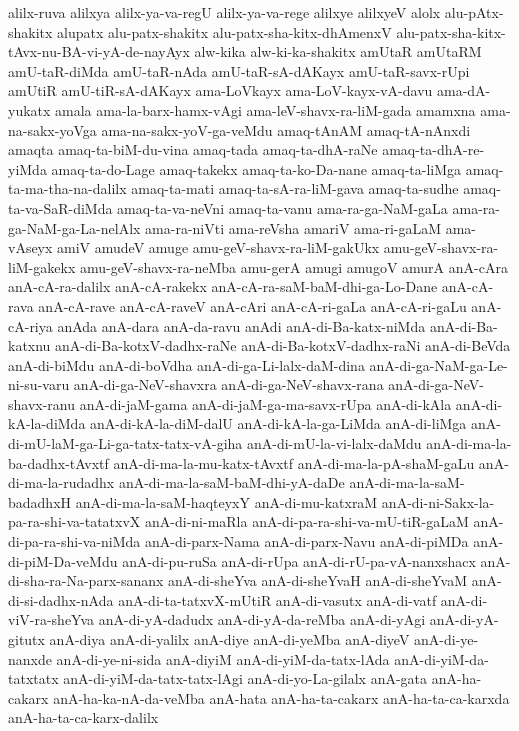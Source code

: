 {alilx-ruva
alilxya
alilx-ya-va-regU
alilx-ya-va-rege
alilxye
alilxyeV
alolx
alu-pAtx-shakitx
alupatx
alu-patx-shakitx
alu-patx-sha-kitx-dhAmenxV
alu-patx-sha-kitx-tAvx-nu-BA-vi-yA-de-nayAyx
alw-kika
alw-ki-ka-shakitx
amUtaR
amUtaRM
amU-taR-diMda
amU-taR-nAda
amU-taR-sA-dAKayx
amU-taR-savx-rUpi
amUtiR
amU-tiR-sA-dAKayx
ama-LoVkayx
ama-LoV-kayx-vA-davu
ama-dA-yukatx
amala
ama-la-barx-hamx-vAgi
ama-leV-shavx-ra-liM-gada
amamxna
ama-na-sakx-yoVga
ama-na-sakx-yoV-ga-veMdu
amaq-tAnAM
amaq-tA-nAnxdi
amaqta
amaq-ta-biM-du-vina
amaq-tada
amaq-ta-dhA-raNe
amaq-ta-dhA-re-yiMda
amaq-ta-do-Lage
amaq-takekx
amaq-ta-ko-Da-nane
amaq-ta-liMga
amaq-ta-ma-tha-na-dalilx
amaq-ta-mati
amaq-ta-sA-ra-liM-gava
amaq-ta-sudhe
amaq-ta-va-SaR-diMda
amaq-ta-va-neVni
amaq-ta-vanu
ama-ra-ga-NaM-gaLa
ama-ra-ga-NaM-ga-La-nelAlx
ama-ra-niVti
ama-reVsha
amariV
ama-ri-gaLaM
ama-vAseyx
amiV
amudeV
amuge
amu-geV-shavx-ra-liM-gakUkx
amu-geV-shavx-ra-liM-gakekx
amu-geV-shavx-ra-neMba
amu-gerA
amugi
amugoV
amurA
anA-cAra
anA-cA-ra-dalilx
anA-cA-rakekx
anA-cA-ra-saM-baM-dhi-ga-Lo-Dane
anA-cA-rava
anA-cA-rave
anA-cA-raveV
anA-cAri
anA-cA-ri-gaLa
anA-cA-ri-gaLu
anA-cA-riya
anAda
anA-dara
anA-da-ravu
anAdi
anA-di-Ba-katx-niMda
anA-di-Ba-katxnu
anA-di-Ba-kotxV-dadhx-raNe
anA-di-Ba-kotxV-dadhx-raNi
anA-di-BeVda
anA-di-biMdu
anA-di-boVdha
anA-di-ga-Li-lalx-daM-dina
anA-di-ga-NaM-ga-Le-ni-su-varu
anA-di-ga-NeV-shavxra
anA-di-ga-NeV-shavx-rana
anA-di-ga-NeV-shavx-ranu
anA-di-jaM-gama
anA-di-jaM-ga-ma-savx-rUpa
anA-di-kAla
anA-di-kA-la-diMda
anA-di-kA-la-diM-dalU
anA-di-kA-la-ga-LiMda
anA-di-liMga
anA-di-mU-laM-ga-Li-ga-tatx-tatx-vA-giha
anA-di-mU-la-vi-lalx-daMdu
anA-di-ma-la-ba-dadhx-tAvxtf
anA-di-ma-la-mu-katx-tAvxtf
anA-di-ma-la-pA-shaM-gaLu
anA-di-ma-la-rudadhx
anA-di-ma-la-saM-baM-dhi-yA-daDe
anA-di-ma-la-saM-badadhxH
anA-di-ma-la-saM-haqteyxY
anA-di-mu-katxraM
anA-di-ni-Sakx-la-pa-ra-shi-va-tatatxvX
anA-di-ni-maRla
anA-di-pa-ra-shi-va-mU-tiR-gaLaM
anA-di-pa-ra-shi-va-niMda
anA-di-parx-Nama
anA-di-parx-Navu
anA-di-piMDa
anA-di-piM-Da-veMdu
anA-di-pu-ruSa
anA-di-rUpa
anA-di-rU-pa-vA-nanxshacx
anA-di-sha-ra-Na-parx-sananx
anA-di-sheYva
anA-di-sheYvaH
anA-di-sheYvaM
anA-di-si-dadhx-nAda
anA-di-ta-tatxvX-mUtiR
anA-di-vasutx
anA-di-vatf
anA-di-viV-ra-sheYva
anA-di-yA-dadudx
anA-di-yA-da-reMba
anA-di-yAgi
anA-di-yA-gitutx
anA-diya
anA-di-yalilx
anA-diye
anA-di-yeMba
anA-diyeV
anA-di-ye-nanxde
anA-di-ye-ni-sida
anA-diyiM
anA-di-yiM-da-tatx-lAda
anA-di-yiM-da-tatxtatx
anA-di-yiM-da-tatx-tatx-lAgi
anA-di-yo-La-gilalx
anA-gata
anA-ha-cakarx
anA-ha-ka-nA-da-veMba
anA-hata
anA-ha-ta-cakarx
anA-ha-ta-ca-karxda
anA-ha-ta-ca-karx-dalilx
}
